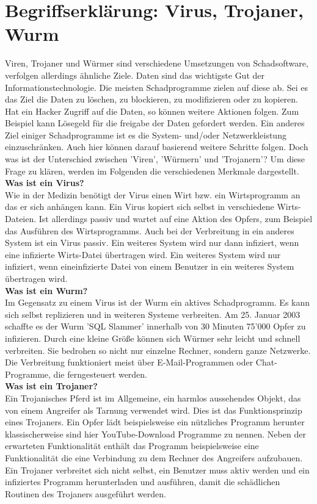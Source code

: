\section{Begriffserklärung: Virus, Trojaner, Wurm}\label{sec:abgrenzung}
Viren, Trojaner und Würmer sind verschiedene Umsetzungen von Schadsoftware,
verfolgen allerdings ähnliche Ziele. Daten sind das wichtigste Gut der
Informationstechnologie. Die meisten Schadprogramme zielen auf diese ab. Sei es
das Ziel die Daten zu löschen, zu blockieren, zu modifizieren oder zu kopieren.
Hat ein Hacker Zugriff auf die Daten, so können weitere Aktionen folgen.
Zum Beispiel kann Lösegeld für die freigabe der Daten gefordert werden.
Ein anderes Ziel einiger Schadprogramme ist es die System- und/oder Netzwerkleistung
einzuschränken. Auch hier können darauf basierend weitere Schritte folgen.
Doch was ist der Unterschied zwischen 'Viren', 'Würmern' und 'Trojanern'?
Um diese Frage zu klären, werden im Folgenden die verschiedenen Merkmale dargestellt.
\cite{KASTRO}\\

\textbf{Was ist ein Virus?}\\
Wie in der Medizin benötigt der Virus einen Wirt bzw. ein Wirtsprogramm an das 
er sich anhängen kann. Ein Virus kopiert sich selbst in verschiedene 
Wirts-Dateien. Ist allerdings passiv und wartet auf eine Aktion des Opfers, 
zum Beispiel das Ausführen des Wirtsprogramms. Auch bei der Verbreitung in ein anderes
System ist ein Virus passiv. Ein weiteres System wird nur dann infiziert, wenn
eine infizierte Wirts-Datei übertragen wird.
Ein weiteres System wird nur infiziert, wenn eineinfizierte Datei 
von einem Benutzer in ein weiteres  System übertragen wird. \\

\textbf{Was ist ein Wurm?}\\
Im Gegensatz zu einem Virus ist der Wurm ein aktives Schadprogramm. Es kann sich
selbst replizieren und in weiteren Systeme verbreiten. Am 25. Januar 2003 schaffte es 
der Wurm 'SQL Slammer' innerhalb von 30 Minuten 75'000 Opfer zu infizieren. Durch
eine kleine Größe können sich Würmer sehr leicht und schnell verbreiten. Sie
bedrohen so nicht nur einzelne Rechner, sondern ganze Netzwerke. Die Verbreitung
funktioniert meist über E-Mail-Programmen oder Chat-Programme, die ferngesteuert werden.\\

\textbf{Was ist ein Trojaner?}\\
Ein Trojanisches Pferd ist im Allgemeine, ein harmlos aussehendes Objekt, das von
einem Angreifer als Tarnung verwendet wird. Dies ist das Funktionsprinzip eines Trojaners. 
Ein Opfer lädt beispielsweise ein nützliches Programm herunter klassischerweise sind hier
YouTube-Download Programme zu nennen. Neben der erwarteten Funktionalität enthält
das Programm beispielsweise eine Funktionalität die eine Verbindung zu dem Rechner
des Angreifers aufzubauen. Ein Trojaner verbreitet sich nicht selbst, ein Benutzer 
muss aktiv werden und ein infiziertes Programm herunterladen und ausführen, damit die
schädlichen Routinen des Trojaners ausgeführt werden.
\cite{ABGVT}